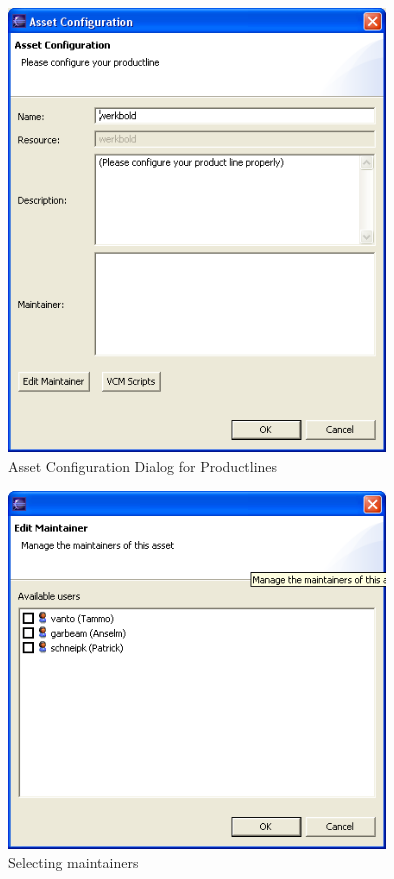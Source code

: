 \begin{figure}[h!]
\begin{center}
\includegraphics[width=10cm]{configpl.png}
   \caption{Asset Configuration Dialog for Productlines}
\label{configpl}
\end{center}
\end{figure}\par

\begin{figure}[h!]
\begin{center}
\includegraphics[width=10cm]{maintainer.png}
   \caption{Selecting maintainers}
\label{maintainer}
\end{center}
\end{figure}\par


